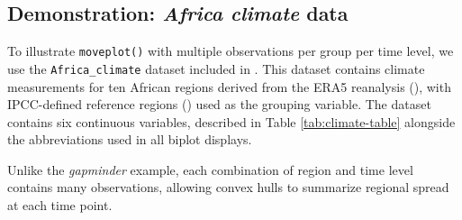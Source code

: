 \subsection{\texorpdfstring{Demonstration: \emph{Africa climate} data}{Demonstration: Africa climate data}}\label{demonstration-africa-climate-data}

To illustrate \texttt{moveplot()} with multiple observations per group per time level, we use the \texttt{Africa\_climate} dataset included in . This dataset contains climate measurements for ten African regions derived from the ERA5 reanalysis (\citet{ERA5}), with IPCC-defined reference regions (\citet{IPCC}) used as the grouping variable. The dataset contains six continuous variables, described in Table \ref{tab:climate-table} alongside the abbreviations used in all biplot displays.

\begin{table}[!h]
\centering
\caption{\label{tab:climate-table}Variables in the Africa climate dataset and their biplot abbreviations.}
\centering
{}
\end{table}

Unlike the \emph{gapminder} example, each combination of region and time level contains many observations, allowing convex hulls to summarize regional spread at each time point.

